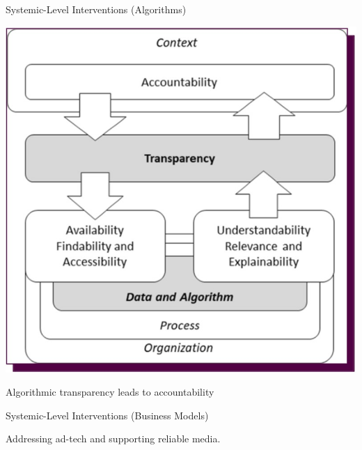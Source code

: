 \documentclass[nobackground,dvipsnames,table]{beamer}
\begin{document}
\begin{frame}{Systemic-Level Interventions
(Algorithms)
}
\begin{center}
    \begin{minipage}{.6\textwidth}
        \includegraphics[width=\textwidth]{img/fig11.jpg} \newline 
    \end{minipage}
    \begin{minipage}{.6\textwidth}
        Algorithmic transparency leads to accountability
    \end{minipage}
\end{center}

    
\end{frame}


\begin{frame}{Systemic-Level Interventions
(Business Models)}

Addressing ad-tech and supporting reliable media.

\end{frame}
\end{document}
